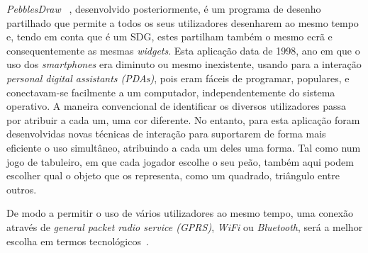 \textit{PebblesDraw} ~\cite{Myers1998a}, desenvolvido posteriormente,  é um programa de desenho partilhado que permite a todos os seus utilizadores desenharem ao mesmo tempo e, tendo em conta que é um SDG, estes partilham também o mesmo ecrã e consequentemente as mesmas \textit{widgets}. Esta aplicação data de 1998, ano em que o uso dos \textit{smartphones} era diminuto ou mesmo inexistente, usando para a interação \textit{personal digital assistants (PDAs)}, pois eram fáceis de programar, populares, e conectavam-se facilmente a um computador, independentemente do sistema operativo. 
A maneira convencional de identificar os diversos utilizadores passa por atribuir a cada um, uma cor diferente. No entanto, para esta aplicação foram desenvolvidas novas técnicas de interação para suportarem de forma mais eficiente o uso simultâneo, atribuindo a cada um deles uma forma. Tal como num jogo de tabuleiro, em que cada jogador escolhe o seu peão, também aqui podem escolher qual o objeto que os representa, como um quadrado, triângulo entre outros.

De modo a permitir o uso de vários utilizadores ao mesmo tempo, uma conexão através de \textit{general packet radio service (GPRS)}, \textit{WiFi} ou \textit{Bluetooth}, será a melhor escolha em termos tecnológicos~\cite{Ballagas}.

